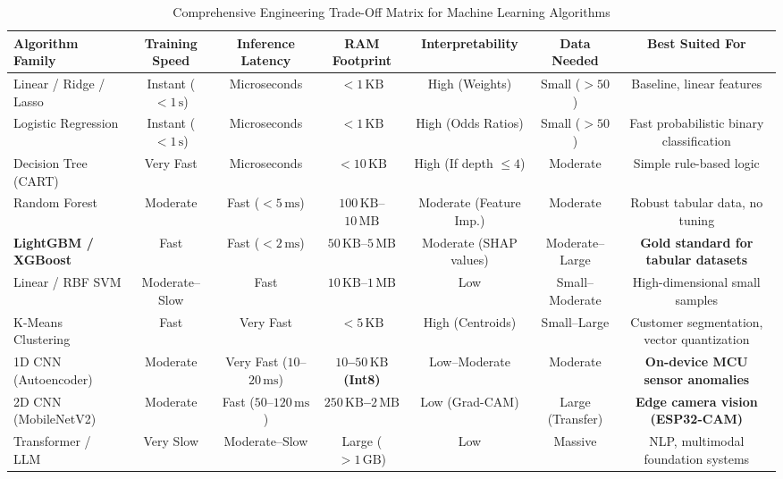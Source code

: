 \begin{table}[htbp]
\centering
\scriptsize
\caption{Comprehensive Engineering Trade-Off Matrix for Machine Learning Algorithms}\label{tab:algo_tradeoffs}
\begin{tabular}{@{}lcccccc@{}}
\toprule
\textbf{Algorithm Family} & \textbf{Training Speed} & \textbf{Inference Latency} & \textbf{RAM Footprint} & \textbf{Interpretability} & \textbf{Data Needed} & \textbf{Best Suited For} \\ \midrule
Linear / Ridge / Lasso & Instant ($< 1\,\text{s}$) & Microseconds & $< 1\,\text{KB}$ & High (Weights) & Small ($> 50$) & Baseline, linear features \\
Logistic Regression & Instant ($< 1\,\text{s}$) & Microseconds & $< 1\,\text{KB}$ & High (Odds Ratios) & Small ($> 50$) & Fast probabilistic binary classification \\
Decision Tree (CART) & Very Fast & Microseconds & $< 10\,\text{KB}$ & High (If depth $\le 4$) & Moderate & Simple rule-based logic \\
Random Forest & Moderate & Fast ($< 5\,\text{ms}$) & $100\,\text{KB}$--$10\,\text{MB}$ & Moderate (Feature Imp.) & Moderate & Robust tabular data, no tuning \\
\textbf{LightGBM / XGBoost} & Fast & Fast ($< 2\,\text{ms}$) & $50\,\text{KB}$--$5\,\text{MB}$ & Moderate (SHAP values) & Moderate--Large & \textbf{Gold standard for tabular datasets} \\
Linear / RBF SVM & Moderate--Slow & Fast & $10\,\text{KB}$--$1\,\text{MB}$ & Low & Small--Moderate & High-dimensional small samples \\
K-Means Clustering & Fast & Very Fast & $< 5\,\text{KB}$ & High (Centroids) & Small--Large & Customer segmentation, vector quantization \\
1D CNN (Autoencoder) & Moderate & Very Fast ($10$--$20\,\text{ms}$) & \textbf{$10$--$50\,\text{KB}$ (Int8)} & Low--Moderate & Moderate & \textbf{On-device MCU sensor anomalies} \\
2D CNN (MobileNetV2) & Moderate & Fast ($50$--$120\,\text{ms}$) & \textbf{$250\,\text{KB}$--$2\,\text{MB}$} & Low (Grad-CAM) & Large (Transfer) & \textbf{Edge camera vision (ESP32-CAM)} \\
Transformer / LLM & Very Slow & Moderate--Slow & Large ($> 1\,\text{GB}$) & Low & Massive & NLP, multimodal foundation systems \\ \bottomrule
\end{tabular}
\end{table}

